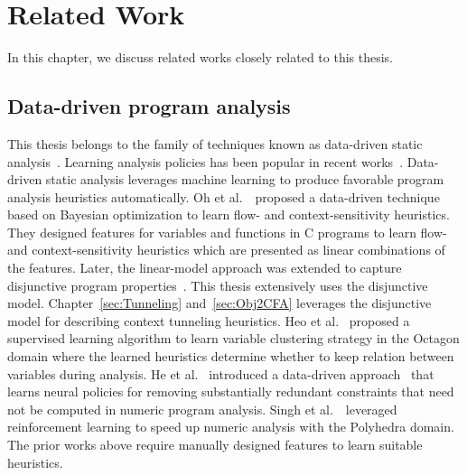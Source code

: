 \chapter{Related Work}
\label{sec:Related}

In this chapter, we discuss related works closely related to this thesis.




\section{Data-driven program analysis}
This thesis belongs to the family of techniques known as data-driven static analysis~\cite{Oh2015, CHA20181,cha2016learning,JeJeChOh17,heo2016unsound,He20pldi}.
Learning analysis policies has been popular in recent 
works~\cite{Bielik2017,Peleg2016,Oh2015,JeJeChOh17,Jeon2019,Singh2018cav,heo2017unsound,Heo2019resource,Grigore2016,He2020,WeiR15,Graphick20}.
Data-driven static analysis leverages machine learning to produce favorable program analysis heuristics automatically.
Oh et al.~\cite{Oh2015}~proposed a data-driven technique based on Bayesian optimization to learn flow- and context-sensitivity heuristics.
They designed features for variables and functions in C programs to learn flow- and context-sensitivity heuristics which are presented as linear combinations of the features.
Later, the linear-model approach was extended to capture disjunctive program properties~\cite{JeJeChOh17}.
This thesis extensively uses the disjunctive model. Chapter~\ref{sec:Tunneling} and~\ref{sec:Obj2CFA} leverages the disjunctive model for describing context tunneling heuristics.
Heo et al.~\cite{Heo2016learning} proposed a supervised learning algorithm to learn variable clustering strategy in the Octagon domain
where the learned heuristics determine whether to keep relation between variables during analysis.
He et al.~\cite{He20pldi} introduced a data-driven approach \Lait~that learns neural policies for removing substantially redundant constraints that need not be computed in numeric program analysis.
Singh et al.~\cite{Singh2018cav}~leveraged reinforcement learning to speed up numeric analysis with the Polyhedra domain.
The prior works above require manually designed features to learn suitable heuristics.
